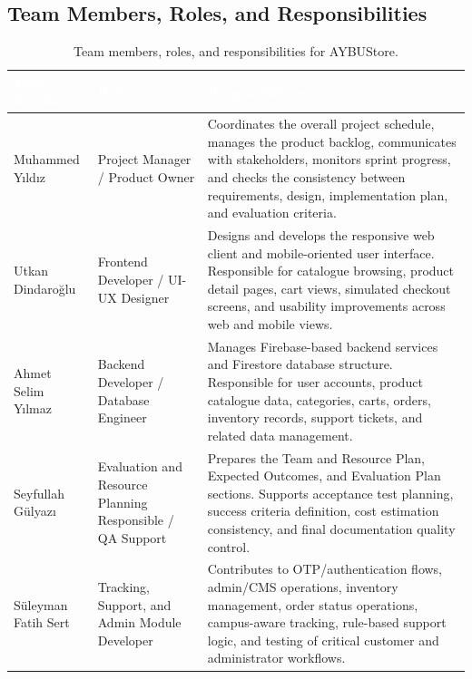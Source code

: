 \documentclass[11pt,a4paper]{article}
\begin{document}
\subsection{Team Members, Roles, and Responsibilities}

\renewcommand{\arraystretch}{1.25}
\begin{table}[H]
\centering
\small
\begin{tabularx}{\textwidth}{|p{}|p{}|X|}
\hline
\rowcolor{aybuHeader}
\textcolor{white}{\textbf{Team Member}} &
\textcolor{white}{\textbf{Role}} &
\textcolor{white}{\textbf{Responsibilities}} \\ \hline

Muhammed Yıldız &
Project Manager / Product Owner &
Coordinates the overall project schedule, manages the product backlog,
communicates with stakeholders, monitors sprint progress, and checks the
consistency between requirements, design, implementation plan, and
evaluation criteria. \\ \hline

Utkan Dindaroğlu &
Frontend Developer / UI-UX Designer &
Designs and develops the responsive web client and mobile-oriented user
interface. Responsible for catalogue browsing, product detail pages, cart
views, simulated checkout screens, and usability improvements across web
and mobile views. \\ \hline

Ahmet Selim Yılmaz &
Backend Developer / Database Engineer &
Manages Firebase-based backend services and Firestore database structure.
Responsible for user accounts, product catalogue data, categories, carts,
orders, inventory records, support tickets, and related data management. \\ \hline

Seyfullah Gülyazı &
Evaluation and Resource Planning Responsible / QA Support &
Prepares the Team and Resource Plan, Expected Outcomes, and Evaluation
Plan sections. Supports acceptance test planning, success criteria
definition, cost estimation consistency, and final documentation quality
control. \\ \hline

Süleyman Fatih Sert &
Tracking, Support, and Admin Module Developer &
Contributes to OTP/authentication flows, admin/CMS operations, inventory
management, order status operations, campus-aware tracking, rule-based
support logic, and testing of critical customer and administrator workflows. \\ \hline

\end{tabularx}
\caption{Team members, roles, and responsibilities for AYBUStore.}
\label{tab:team-roles}
\end{table}
\end{document}
